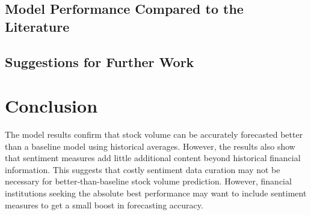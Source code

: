 \documentclass[12pt]{article}
\begin{document}
\subsection{Model Performance Compared to the Literature}
\subsection{Suggestions for Further Work}

\section{Conclusion}
The model results confirm that stock volume can be accurately forecasted better than a baseline model using historical averages. However, the results also show that sentiment measures add little additional content beyond historical financial information. This suggests that costly sentiment data curation may not be necessary for better-than-baseline stock volume prediction. However, financial institutions seeking the absolute best performance may want to include sentiment measures to get a small boost in forecasting accuracy.

\newpage
\printbibliography
\end{document}

